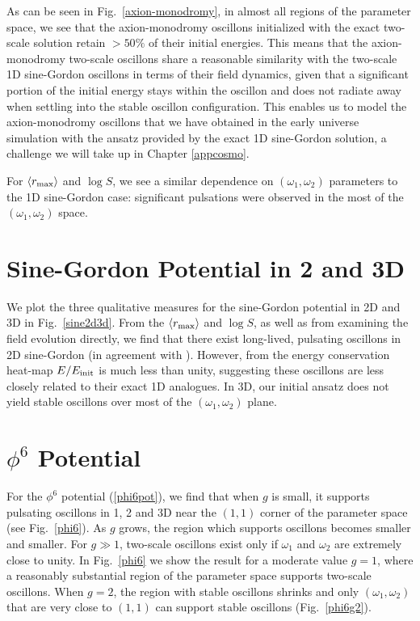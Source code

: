 \documentclass[11pt]{book}
\begin{document}
As can be seen in Fig.~\ref{axion-monodromy}, in almost all regions of the parameter space, we see that the axion-monodromy oscillons initialized with the exact two-scale solution retain $>50\%$ of their initial energies. This means that the axion-monodromy two-scale oscillons share a reasonable similarity with the two-scale 1D sine-Gordon oscillons in terms of their field dynamics, given that a significant portion of the initial energy stays within the oscillon and does not radiate away when settling into the stable oscillon configuration. This enables us to model the axion-monodromy oscillons that we have obtained in the early universe simulation with the ansatz provided by the exact 1D sine-Gordon solution, a challenge we will take up in Chapter \ref{appcosmo}.

For $\langle r_{\rm max}\rangle$ and $\log S$, we see a similar dependence on $(\omega_1,\omega_2)$ parameters to the 1D sine-Gordon case: significant pulsations were observed in the most of the $(\omega_1,\omega_2)$ space.
 
\section{Sine-Gordon Potential in 2 and 3D}

We plot the three qualitative measures for the sine-Gordon potential in 2D and 3D in Fig.~\ref{sine2d3d}. From the $\langle r_{\rm max}\rangle$ and $\log{S}$, as well as from examining the field evolution directly, we find that there exist long-lived, pulsating oscillons in 2D sine-Gordon (in agreement with  \cite{Hindmarsh:2006ur}). However, from the energy conservation heat-map $E/E_{\rm init}$ is much less than unity, suggesting these oscillons are less closely related to their exact 1D analogues. In 3D, our initial ansatz does not yield stable oscillons over most of the $(\omega_1,\omega_2)$ plane.

\section{$\phi^6$ Potential}
For the $\phi^6$ potential (\ref{phi6pot}), we find that when $g$ is small, it supports pulsating oscillons in 1, 2 and 3D near the $(1,1)$ corner of the parameter space (see Fig.~\ref{phi6}). As $g$ grows, the region which supports oscillons becomes smaller and smaller. For $g\gg 1$, two-scale oscillons exist only if  $\omega_1$ and $\omega_2$ are extremely close to unity. In Fig.~\ref{phi6} we show the result for a moderate value $g=1$, where a reasonably substantial region of the parameter space supports two-scale oscillons. When $g=2$, the region with stable oscillons shrinks and only $(\omega_1,\omega_2)$ that are very close to $(1,1)$ can support stable oscillons (Fig.~\ref{phi6g2}).
\end{document}

